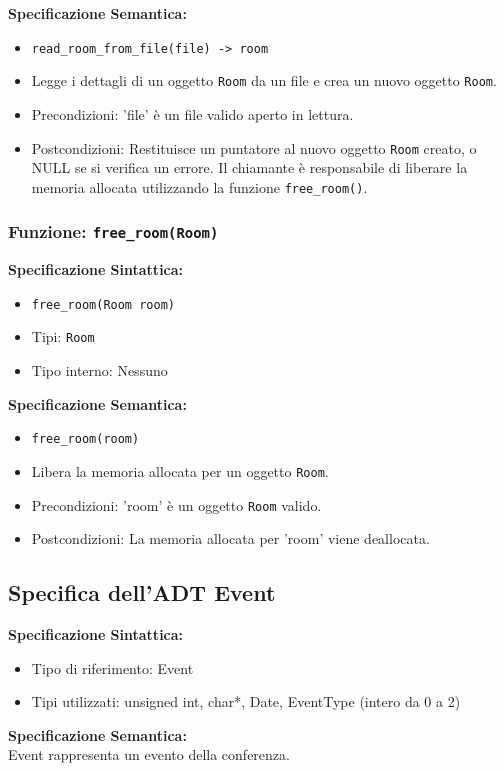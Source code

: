 \documentclass[11pt]{scrartcl} %
\begin{document}
\textbf{Specificazione Semantica:}
\begin{itemize}
	\item \texttt{read\_room\_from\_file(file) -> room}
	\item Legge i dettagli di un oggetto \texttt{Room} da un file e crea un nuovo oggetto \texttt{Room}.
	\item Precondizioni: 'file' è un file valido aperto in lettura.
	\item Postcondizioni: Restituisce un puntatore al nuovo oggetto \texttt{Room} creato, o NULL se si verifica un errore. Il chiamante è responsabile di liberare la memoria allocata utilizzando la funzione \texttt{free\_room()}.
\end{itemize}

\subsubsection{Funzione: \texttt{free\_room(Room)}}

\textbf{Specificazione Sintattica:}
\begin{itemize}
	\item \texttt{free\_room(Room room)}
	\item Tipi: \texttt{Room}
	\item Tipo interno: Nessuno
\end{itemize}

\textbf{Specificazione Semantica:}
\begin{itemize}
	\item \texttt{free\_room(room)}
	\item Libera la memoria allocata per un oggetto \texttt{Room}.
	\item Precondizioni: 'room' è un oggetto \texttt{Room} valido.
	\item Postcondizioni: La memoria allocata per 'room' viene deallocata.
\end{itemize}

\subsection{Specifica dell'ADT Event}

\textbf{Specificazione Sintattica:}
\begin{itemize}
	\item Tipo di riferimento: Event
	\item Tipi utilizzati: unsigned int, char*, Date, EventType (intero da 0 a 2)
\end{itemize}
\textbf{Specificazione Semantica:} \\
Event rappresenta un evento della conferenza.\\
\end{document}
